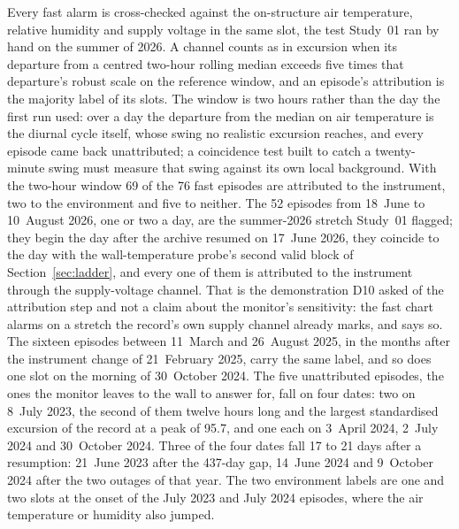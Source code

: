\documentclass[11pt,a4paper]{article}
\begin{document}
Every fast alarm is cross-checked against the on-structure air temperature,
relative humidity and supply voltage in the same slot, the test Study~01 ran by
hand on the summer of 2026. A channel counts as in excursion when its departure
from a centred two-hour rolling median exceeds five times that departure's
robust scale on the reference window, and an episode's attribution is the
majority label of its slots. The window is two hours rather than the day the
first run used: over a day the departure from the median on air temperature is
the diurnal cycle itself, whose swing no realistic excursion reaches, and every
episode came back unattributed; a coincidence test built to catch a
twenty-minute swing must measure that swing against its own local background.
With the two-hour window 69 of the 76 fast episodes are attributed to the
instrument, two to the environment and five to neither. The 52 episodes from
18~June to 10~August 2026, one or two a day, are the summer-2026 stretch
Study~01 flagged; they begin the day after the archive resumed on 17~June
2026, they coincide to the day with the wall-temperature probe's second valid
block of Section~\ref{sec:ladder}, and every one of them is attributed to the
instrument through the supply-voltage channel. That is the demonstration D10
asked of the attribution step and not a claim about the monitor's
sensitivity: the fast chart alarms on a stretch the record's own supply
channel already marks, and says so. The sixteen episodes between 11~March and
26~August 2025, in the months after the instrument change of 21~February 2025,
carry the same label, and so does one slot on the morning of 30~October 2024.
The five unattributed episodes, the ones the monitor leaves to the wall to
answer for, fall on four dates: two on 8~July 2023, the second of them twelve
hours long and the largest standardised excursion of the record at a peak of
95.7, and one each on 3~April 2024, 2~July 2024 and 30~October 2024. Three of
the four dates fall 17 to 21 days after a resumption: 21~June 2023 after the
437-day gap, 14~June 2024 and 9~October 2024 after the two outages of that
year. The two environment labels are one and two slots at the onset of the
July 2023 and July 2024 episodes, where the air temperature or humidity also
jumped.
\end{document}
